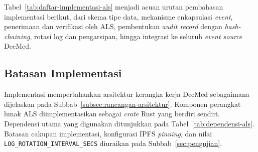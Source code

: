 Tabel~\ref{tab:daftar-implementasi-als} menjadi acuan urutan pembahasan
implementasi berikut, dari skema tipe data, mekanisme enkapsulasi \textit{event},
penerimaan dan verifikasi oleh ALS, pembentukan \textit{audit record} dengan
\textit{hash-chaining}, rotasi log dan pengarsipan, hingga integrasi ke seluruh
\textit{event source} DecMed.

\subsection{Batasan Implementasi}

Implementasi mempertahankan arsitektur kerangka kerja DecMed sebagaimana
dijelaskan pada Subbab~\ref{subsec:rancangan-arsitektur}. Komponen perangkat
lunak ALS diimplementasikan sebagai \textit{crate} Rust yang berdiri sendiri.
Dependensi utama yang digunakan ditunjukkan pada Tabel~\ref{tab:dependensi-als}.
Batasan cakupan implementasi, konfigurasi IPFS \textit{pinning}, dan nilai
\texttt{LOG\_ROTATION\_INTERVAL\_SECS} diuraikan pada
Subbab~\ref{sec:pengujian}.

